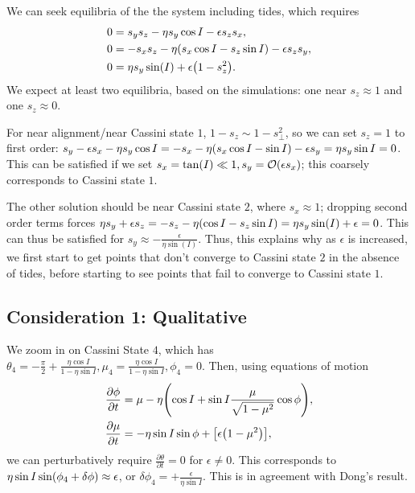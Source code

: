 \documentclass[11pt,
        usenames, %
        dvipsnames %
    ]{article}
\newcommand*{\pd}[2]{\frac{\partial#1}{\partial#2}}
\DeclarePairedDelimiter\p{\lparen}{\rparen}
\DeclarePairedDelimiter\s{\lbrack}{\rbrack}
\begin{document}
We can seek equilibria of the the system including tides, which requires
\begin{align*}
    0 &= s_ys_z - \eta s_y\cos I - \epsilon s_zs_x,\\
    0 &= -s_xs_z - \eta\p*{s_x \cos I - s_z \sin I} - \epsilon s_zs_y,\\
    0 &= \eta s_y\sin(I) + \epsilon \p*{1 - s_z^2}.
\end{align*}
We expect at least two equilibria, based on the simulations: one near $s_z
\approx 1$ and one $s_z \approx 0$.

For near alignment/near Cassini state $1$, $1 - s_z \sim 1 - s_{\perp}^2$, so we
can set $s_z = 1$ to first order: $s_y - \epsilon s_x - \eta s_y \cos I = -s_x -
\eta\p*{s_x \cos I - \sin I} - \epsilon s_y = \eta s_y \sin I = 0$. This can be
satisfied if we set $s_x = \tan(I) \ll 1, s_y = \mathcal{O}\p*{\epsilon s_x}$;
this coarsely corresponds to Cassini state $1$.

The other solution should be near Cassini state $2$, where $s_x \approx 1$;
dropping second order terms forces $\eta s_y + \epsilon s_z = -s_z -
\eta\p*{\cos I - s_z\sin I} = \eta s_y \sin(I) + \epsilon = 0$. This can thus be
satisfied for $s_y \approx -\frac{\epsilon}{\eta \sin(I)}$. Thus, this explains
why as $\epsilon$ is increased, we first start to get points that don't converge
to Cassini state $2$ in the absence of tides, before starting to see points that
fail to converge to Cassini state $1$.

\subsection{Consideration 1: Qualitative}

We zoom in on Cassini State $4$, which has $\theta_4 =
-\frac{\pi}{2} + \frac{\eta \cos I}{1 - \eta \sin I}, \mu_4 = \frac{\eta \cos
I}{1 - \eta \sin I}, \phi_4 = 0$. Then, using
equations of motion
\begin{align}
    \pd{\phi}{t} &= \mu - \eta\p*{\cos I + \sin I \frac{\mu}{\sqrt{1 - \mu^2}}
        \cos \phi} ,\\
    \pd{\mu}{t} &= -\eta \sin I \sin \phi + \s*{\epsilon \p*{1 - \mu^2}},
\end{align}
we can perturbatively require $\pd{\theta}{t} = 0$ for $\epsilon \neq 0$. This
corresponds to $\eta \sin I \sin \p*{\phi_4 + \delta \phi} \approx \epsilon$, or
$\delta \phi_4 = +\frac{\epsilon}{\eta \sin I}$. This is in agreement with
Dong's result.
\end{document}
